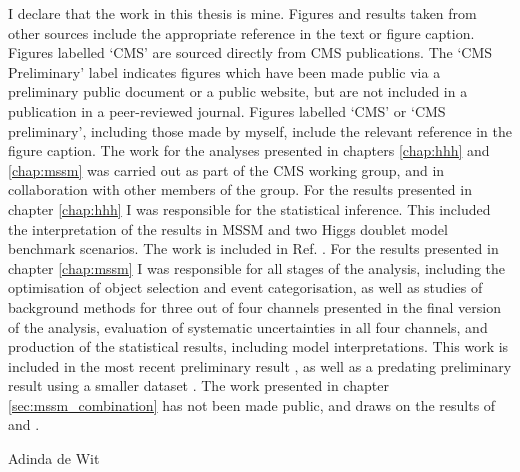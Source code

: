 \begin{declaration}
  \vspace*{1cm}
  I declare that the work in this thesis is mine. Figures and results taken from other sources
include the appropriate reference in the text or figure caption. Figures labelled `CMS' are sourced
directly from CMS publications. The `CMS Preliminary' label indicates figures which
have been made public via a preliminary public document or a public website, but are not
included in a publication in a peer-reviewed journal. Figures labelled `CMS' or `CMS preliminary', 
including those made by myself, include the relevant reference in the figure caption.
The work for the analyses presented in chapters \ref{chap:hhh} and \ref{chap:mssm} was 
carried out as part of the CMS \Htotautau working group, and in collaboration with other members of the group.
For the results presented in chapter \ref{chap:hhh} I 
was responsible for the statistical inference. This included
the interpretation of the results in MSSM and two Higgs doublet model benchmark scenarios. The 
work is included in Ref. \cite{CMS-HIG-14-034}. For the results presented in chapter \ref{chap:mssm}
I was responsible for all stages of the analysis, including the optimisation
of object selection and event categorisation, as well as studies of background
methods for three out of four channels presented in the final version of the analysis,
evaluation of systematic uncertainties in all four channels, and production of the statistical
results, including model interpretations. This work is included in the most recent
preliminary result \cite{CMS-PAS-HIG-16-037}, as well as a predating preliminary
result using a smaller dataset \cite{CMS-PAS-HIG-16-006}.
The work presented in chapter \ref{sec:mssm_combination} has
not been made public, and draws on the results of \cite{CMS-PAS-HIG-16-037} and \cite{CMS-PAS-HIG-16-006}.

  \begin{flushright}
  Adinda de Wit
  \end{flushright}
\end{declaration}




\tableofcontents




\thispagestyle{empty}
